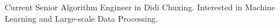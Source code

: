 

\begin{cvparagraph}

Current Senior Algorithm Engineer in Didi Chuxing. Interested in Machine Learning and Large-scale Data Processing. 
\end{cvparagraph}
